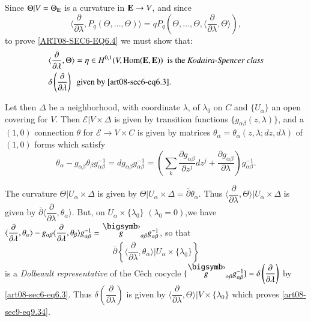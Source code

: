 Since $\Theta |V=\Theta_{\mathbf{E}}$ is a curvature in $\mathbf{E}\to V$, and since
$$
\langle \dfrac{\partial}{\partial\lambda}, P_{q}(\Theta,\ldots,\Theta)\rangle =qP_{q}(\Theta,\ldots,\Theta,\langle \dfrac{\partial}{\partial \lambda},\Theta\rangle ),
$$
to prove \eqref{ART08-SEC6-EQ6.4} we must show that:
\begin{align}
& \langle\dfrac{\partial}{\partial\lambda},\Theta\rangle=\eta\in H^{0,1}(V,\operatorname{\mathrm{Hom}}(\mathbf{E},\mathbf{E}))\text{~ is the {\em Kodaira-Spencer class}}\notag\\
& \delta\left(\dfrac{\partial}{\partial\lambda}\right)\text{~ given by \eqref{art08-sec6-eq6.3}}.\label{art08-sec9-eq9.34}
\end{align}

Let then $\Delta$ be a neighborhood, with coordinate $\lambda$, of $\lambda_{0}$ on $C$ and $\{U_{\alpha}\}$ an open covering for $V$. Then $\mathcal{E}|V\times \Delta$ is given by transition functions $\{g_{\alpha\beta}(z,\lambda)\}$, and a $(1,0)$ connection $\theta$ for $\mathcal{E}\to V\times C$ is given by matrices $\theta_{\alpha}=\theta_{\alpha}(z,\lambda;dz,d\lambda)$ of $(1,0)$ forms which satisfy
\begin{equation}
\theta_{\alpha}-g_{\alpha\beta}\theta_{\beta}g^{-1}_{\alpha\beta}=dg_{\alpha\beta}g^{-1}_{\alpha\beta}=\left(\sum\limits_{k}\dfrac{\partial g_{\alpha\beta}}{\partial z^{j}}dz^{j}+\dfrac{\partial g_{\alpha\beta}}{\partial \lambda}\right)g^{-1}_{\alpha\beta}.\label{art08-sec9-eq9.35}
\end{equation}

The curvature $\Theta|U_{\alpha}\times \Delta$ is given by $\Theta |U_{\alpha}\times \Delta=\overline{\partial}\theta_{\alpha}$. Thus $\langle \dfrac{\partial}{\partial\lambda},\Theta\rangle |U_{\alpha}\times \Delta$ is given by $\overline{\partial}\langle \dfrac{\partial}{\partial\lambda},\theta_{\alpha}\rangle$. But, on $U_{\alpha}\times \{\lambda_{0}\}$ $(\lambda_{0}=0)$,\pageoriginale we have $\langle \dfrac{\partial}{\partial\lambda},\theta_{\alpha}\rangle - g_{\alpha\beta}\langle \dfrac{\partial}{\partial\lambda},\theta_{\beta}\rangle g^{-1}_{\alpha\beta}=\overdot{g}_{\alpha\beta}g^{-1}_{\alpha\beta}$, so that 
$$
\overline{\partial}\left\{\langle \dfrac{\partial}{\partial\lambda}, \theta_{\alpha}\rangle | U_{\alpha}\times \{\lambda_{0}\}\right\}
$$ 
is a {\em Dolbeault representative} of the C\^ech cocycle $\{\overdot{g}_{\alpha\beta}g^{-1}_{\alpha\beta}\}=\delta\left(\dfrac{\partial}{\partial\lambda}\right)$ by \eqref{art08-sec6-eq6.3}. Thus $\delta\left(\dfrac{\partial}{\partial\lambda}\right)$ is given by $\langle \dfrac{\partial}{\partial\lambda},\Theta\rangle | V\times \{\lambda_{0}\}$ which proves \eqref{art08-sec9-eq9.34}.

